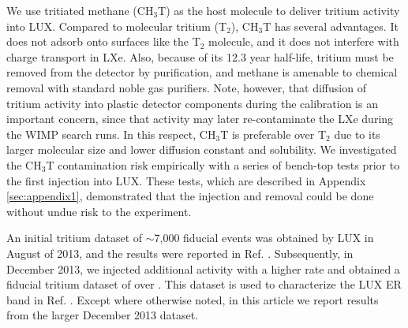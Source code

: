 We use tritiated methane (CH$_3$T) as the host molecule to deliver tritium activity into LUX. Compared to molecular tritium (T$_2$), CH$_3$T has several advantages. It does not adsorb onto surfaces like the T$_2$ molecule, and it does not interfere with charge transport in LXe. Also, because of its 12.3 year half-life, tritium must be removed from the detector by purification, and methane is amenable to chemical removal with standard noble gas purifiers\cite{Dobi_CH4}. Note, however, that diffusion of tritium activity into plastic detector components during the calibration is an important concern, since that activity may later re-contaminate the LXe during the WIMP search runs.  In this respect, CH$_3$T is preferable over T$_2$ due to its larger molecular size and lower diffusion constant and solubility\cite{miyake:1983}. We investigated the CH$_3$T contamination risk empirically with a series of bench-top tests prior to the first injection into LUX. These tests, which are described in Appendix \ref{sec:appendix1}, demonstrated that the injection and removal could be done without undue risk to the experiment. 

An initial tritium dataset of $\sim$7,000 fiducial events was obtained by LUX in August of 2013, and the results were reported in Ref. \cite{lux-prl}. Subsequently, in December 2013, we injected additional activity with a higher rate and obtained a fiducial tritium dataset of over . This dataset is used to characterize the LUX ER band in Ref. \cite{lux-reanalysis}. Except where otherwise noted, in this article we report results from the larger December 2013 dataset.